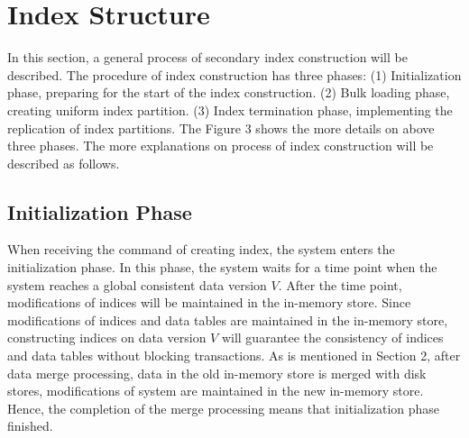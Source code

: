 
\section{Index Structure}
\vspace{-0.2cm}
In this section, a general process of secondary index construction will be described. The procedure of index construction has three phases: (1) Initialization phase, preparing for the start of the index construction. (2) Bulk loading phase, creating uniform index partition. (3) Index termination phase, implementing the replication of index partitions. The Figure 3 shows the more details on above three phases.
The more explanations on process of index construction will be described as follows.


\vspace{-0.2cm}
\subsection{Initialization Phase}
When receiving  the command of creating index, the system enters the initialization phase. In this phase, the system waits for a time point when the system reaches a global consistent data version $V$. After the time point, modifications of indices will be maintained in the in-memory store. Since modifications of indices and data tables are maintained in the in-memory store, constructing indices on data version $V$ will guarantee the consistency of indices and data tables without blocking transactions. As is mentioned in Section 2, after data merge processing, data in the old in-memory store is merged with disk stores, modifications of system are maintained in the new in-memory store. Hence, the completion of the merge processing means that initialization phase finished.

\vspace{-0.2cm}
